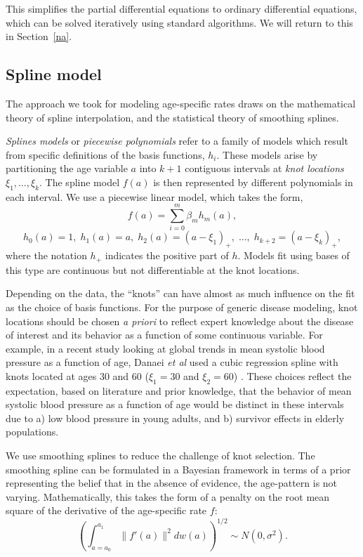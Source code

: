 \documentclass[12pt]{article}
\newcommand{\1}{\mathbf{1}}
\newcommand{\0}{\mathbf{0}}
\begin{document}
This simplifies the partial differential equations to ordinary
differential equations, which can be solved iteratively using standard
algorithms.  We will return to this in Section~\ref{na}.

\subsection{Spline model}

The approach we took for modeling age-specific rates draws
on the mathematical theory of spline interpolation, and the
statistical theory of smoothing splines.

\emph{Splines models} or \emph{piecewise polynomials} refer to a
family of models which result from specific definitions of the basis
functions, $h_i$. These models arise by partitioning the age variable $a$
into $k+1$ contiguous intervals at \emph{knot locations} $\xi_1,
\dots, \xi_{k}$. The spline model $f(a)$ is then represented by different
polynomials in each interval.  We use
a piecewise linear model, which takes the form,
\[
f(a) = \sum_{i=0}^m\beta_m h_m(a),
\]
\[
h_0(a) = 1,\; h_1(a) = a,\; h_2(a) = (a-\xi_1)_+,\; \dots,\; h_{k+2}=(a-\xi_k)_+,
\]
where the notation $h_+$ indicates the positive part of $h$. Models
fit using bases of this type are continuous but not differentiable at
the knot locations.

Depending on the data, the ``knots'' can have almost as much influence
on the fit as the choice of basis functions.  For the purpose of
generic disease modeling, knot locations should be chosen \emph{a
  priori} to reflect expert knowledge about the disease of interest
and its behavior as a function of some continuous variable. For
example, in a recent study looking at global trends in mean systolic
blood pressure as a function of age, Danaei \emph{et al} used a cubic
regression spline with knots located at ages 30 and 60 ($\xi_1 = 30$
and $\xi_2=60$) \cite{Danaei_National_2011}. These choices reflect the
expectation, based on literature and prior knowledge, that the
behavior of mean systolic blood pressure as a function of age would be
distinct in these intervals due to a) low blood pressure in young
adults, and b) survivor effects in elderly populations.

We use smoothing splines to reduce the challenge of knot selection.
The smoothing spline can be formulated in a Bayesian framework in
terms of a prior representing the belief that in the absence of
evidence, the age-pattern is not varying.  Mathematically, this takes
the form of a penalty on the root mean square of the derivative of the
age-specific rate $f$:
\[
\left(\int _{a=a_0} ^{a_1} \| f'(a) \|^2 dw(a)\right)^{1/2} \sim N(0, \sigma^2).
\]
\end{document}
